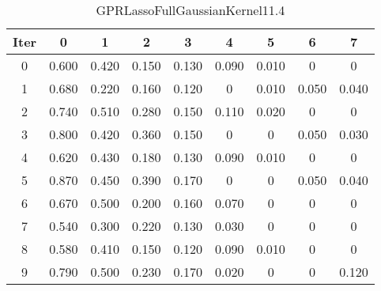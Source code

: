 \begin{table}
	\begin{center}
		\begin{tabular}{|c|c|c|c|c|c|c|c|c|}
			\hline
			Iter & 0 & 1 & 2 & 3 & 4 & 5 & 6 & 7 \\
			\hline
			0 & 0.600 & 0.420 & 0.150 & 0.130 & 0.090 & 0.010 & 0 & 0 \\
			\hline
			1 & 0.680 & 0.220 & 0.160 & 0.120 & 0 & 0.010 & 0.050 & 0.040 \\
			\hline
			2 & 0.740 & 0.510 & 0.280 & 0.150 & 0.110 & 0.020 & 0 & 0 \\
			\hline
			3 & 0.800 & 0.420 & 0.360 & 0.150 & 0 & 0 & 0.050 & 0.030 \\
			\hline
			4 & 0.620 & 0.430 & 0.180 & 0.130 & 0.090 & 0.010 & 0 & 0 \\
			\hline
			5 & 0.870 & 0.450 & 0.390 & 0.170 & 0 & 0 & 0.050 & 0.040 \\
			\hline
			6 & 0.670 & 0.500 & 0.200 & 0.160 & 0.070 & 0 & 0 & 0 \\
			\hline
			7 & 0.540 & 0.300 & 0.220 & 0.130 & 0.030 & 0 & 0 & 0 \\
			\hline
			8 & 0.580 & 0.410 & 0.150 & 0.120 & 0.090 & 0.010 & 0 & 0 \\
			\hline
			9 & 0.790 & 0.500 & 0.230 & 0.170 & 0.020 & 0 & 0 & 0.120 \\
			\hline
		\end{tabular}
	\end{center}
	\caption{GPRLassoFullGaussianKernel11.4}
\end{table}